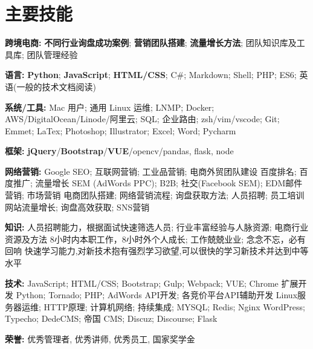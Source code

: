 \section{\textbf{主要技能}}
\resumeSubHeadingListStart
\item{
  \textbf{跨境电商:}{ \textbf{不同行业询盘成功案例}; \textbf{营销团队搭建}; \textbf{流量增长方法}; 团队知识库及工具库; 团队管理经验}
}
\item{
  \textbf{语言:}{ \textbf{Python}; \textbf{JavaScript}; \textbf{HTML/CSS}; C\#; Markdown; Shell; PHP; ES6; 英语(一般的技术文档阅读)}
}
\item{
 \textbf{系统/工具:}{ Mac 用户; 通用 Linux 运维; LNMP; Docker; AWS/DigitalOcean/Linode/阿里云; SQL; 企业路由; zsh/vim/vscode; Git; Emmet; LaTex; Photoshop; Illustrator; Excel; Word; Pycharm}
}
\item{
 \textbf{框架:}{ \textbf{jQuery}/\textbf{Bootstrap}/\textbf{VUE}/opencv/pandas, flask, node}
}
\item{
  \textbf{网络营销:}{
    \resumeItemListStart
       {Google SEO; 互联网营销; 工业品营销; 电商外贸团队建设 }
       {百度排名; 百度推广; 流量增长}
       {SEM (AdWords PPC); B2B; 社交(Facebook SEM); EDM邮件营销; 市场营销 }
       {电商团队搭建; 网络营销流程; 询盘获取方法; 人员招聘; 员工培训 }
       {网站流量增长; 询盘高效获取; SNS营销}
   \resumeItemListEnd
  }
}
\item{
  \textbf{知识:}{
    \resumeItemListStart
       {人员招聘能力，根据面试快速筛选人员; 行业丰富经验与人脉资源; 电商行业资源及方法}
       {8小时内本职工作，8小时外个人成长; 工作兢兢业业; 念念不忘，必有回响}
       {快速学习能力,对新技术抱有强烈学习欲望,可以很快的学习新技术并达到中等水平}
   \resumeItemListEnd
  }
}
\item{
  \textbf{技术:}{
    \resumeItemListStart
       {JavaScript; HTML/CSS; Bootstrap; Gulp; Webpack; VUE; Chrome 扩展开发}
       {Python; Tornado; PHP; AdWords API开发; 各竞价平台API辅助开发}
       {Linux服务器运维; HTTP原理; 计算机网络; 持续集成; MYSQL; Redis; Nginx}
       {WordPress; Typecho; DedeCMS; 帝国 CMS; Discuz; Discourse; Flask}
   \resumeItemListEnd
  }
}
\item{
 \textbf{荣誉:}{
  优秀管理者, 优秀讲师, 优秀员工, 国家奖学金
 }
}
\resumeSubHeadingListEnd
